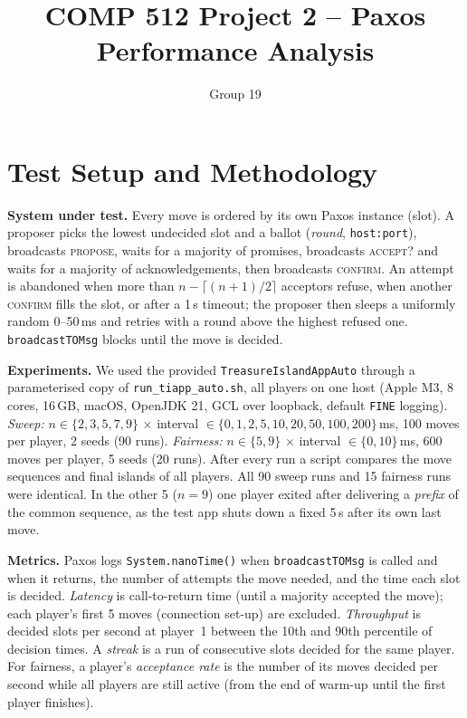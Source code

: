 \documentclass[11pt]{article}
\title{COMP 512 Project 2 -- Paxos Performance Analysis}
\author{Group 19}
\date{}
\begin{document}
\maketitle
\vspace{-1.8em}

\section{Test Setup and Methodology}
\textbf{System under test.} Every move is ordered by its own Paxos instance (slot). A proposer picks the lowest undecided slot and a ballot (\emph{round}, \texttt{host:port}), broadcasts \textsc{propose}, waits for a majority of promises, broadcasts \textsc{accept?} and waits for a majority of acknowledgements, then broadcasts \textsc{confirm}. An attempt is abandoned when more than $n-\lceil (n+1)/2\rceil$ acceptors refuse, when another \textsc{confirm} fills the slot, or after a 1\,s timeout; the proposer then sleeps a uniformly random 0--50\,ms and retries with a round above the highest refused one. \texttt{broadcastTOMsg} blocks until the move is decided.

\textbf{Experiments.} We used the provided \texttt{TreasureIslandAppAuto} through a parameterised copy of \texttt{run\_tiapp\_auto.sh}, all players on one host (Apple M3, 8 cores, 16\,GB, macOS, OpenJDK 21, GCL over loopback, default \texttt{FINE} logging). \emph{Sweep:} $n\in\{2,3,5,7,9\}$ $\times$ interval $\in\{0,1,2,5,10,20,50,100,200\}$\,ms, 100 moves per player, 2 seeds (90 runs). \emph{Fairness:} $n\in\{5,9\}$ $\times$ interval $\in\{0,10\}$\,ms, 600 moves per player, 5 seeds (20 runs). After every run a script compares the move sequences and final islands of all players. All 90 sweep runs and 15 fairness runs were identical. In the other 5 ($n=9$) one player exited after delivering a \emph{prefix} of the common sequence, as the test app shuts down a fixed 5\,s after its own last move.

\textbf{Metrics.} Paxos logs \texttt{System.nanoTime()} when \texttt{broadcastTOMsg} is called and when it returns, the number of attempts the move needed, and the time each slot is decided. \emph{Latency} is call-to-return time (until a majority accepted the move); each player's first 5 moves (connection set-up) are excluded. \emph{Throughput} is decided slots per second at player~1 between the 10th and 90th percentile of decision times. A \emph{streak} is a run of consecutive slots decided for the same player. For fairness, a player's \emph{acceptance rate} is the number of its moves decided per second while all players are still active (from the end of warm-up until the first player finishes).
\end{document}
